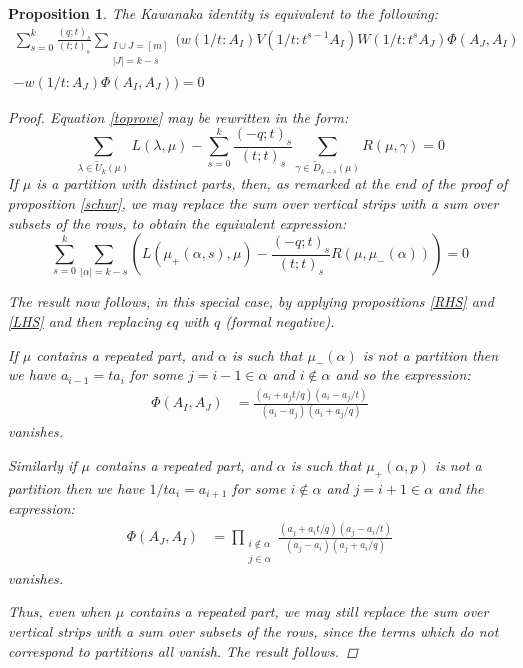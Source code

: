 \documentclass[12pt,dvips]{amsart}
\newtheorem{proposition}{Proposition}[section]
\begin{document}
\bigskip\bigskip
\begin{proposition}
The Kawanaka identity is equivalent to the following:
\begin{multline*}
\!\!\!\!\sum_{s = 0}^k \frac{(q;t)_s}{ (t;t)_s} \sum_{\substack{I \cup J = [m] \\ |J| = k-s}} \Big(w(1/t : A_I) V(1/t : t^{s-1} A_I) W(1/t : t^{s} A_J) \Phi(A_J,A_I) 
\\- w(1/t :  A_J) \Phi(A_I,A_J) \Big) = 0
\end{multline*}



\begin{proof}
Equation \eqref{toprove} may be rewritten in the form:
$$ \sum_{\lambda \in \tilde{U}_k(\mu)} L(\lambda, \mu) - \sum_{s = 0}^k \frac{(-q;t)_s}{(t;t)_s} \sum_{\gamma \in \tilde{D}_{k-s}(\mu)} R(\mu, \gamma) = 0 $$
If $\mu$ is a partition with distinct parts, then, as remarked at the end of the proof of proposition \ref{schur}, we may replace the sum over vertical strips with a sum over subsets of the rows, to obtain the equivalent expression:
$$ \sum_{s = 0}^k \sum_{|\alpha| = k-s} \left( L(\mu_+(\alpha,s), \mu) -  \frac{(-q;t)_s}{(t;t)_s} R(\mu, \mu_-(\alpha)) \right) = 0 $$

\medskip
The result now follows, in this special case, by applying propositions \ref{RHS} and \ref{LHS} and then replacing $\epsilon q$ with $q$ (formal negative).

\medskip
\noindent
If $\mu$ contains a repeated part, and $\alpha$ is such that $\mu_-(\alpha)$ is not a partition then we have $a_{i-1} = ta_i$ for some $j=i-1 \in \alpha$ and $i \not \in \alpha$ and so the expression:
\begin{align*}
\Phi(A_I,A_J)
&= \frac{(a_i + a_j t/q)(a_i - a_j/t)}{(a_i - a_j)(a_i + a_j/q)}
\end{align*}
vanishes.


\medskip
\noindent
Similarly if $\mu$ contains a repeated part, and $\alpha$ is such that $\mu_+(\alpha,p)$ is not a partition then we have $1/ta_i = a_{i+1}$ for some $i \not \in \alpha$ and $j = i+1 \in \alpha$ and the expression: 
\begin{align*}
\Phi(A_J,A_I) 
&= \prod_{\substack{i \not \in \alpha \\ j \in \alpha}}\frac{(a_j + a_i t/q)(a_j - a_i/t)}{(a_j - a_i)(a_j + a_i/q)}
\end{align*}
vanishes.

\medskip
\noindent
Thus, even when $\mu$ contains a repeated part, we may still replace the sum over vertical strips with a sum over subsets of the rows, since the terms which do not correspond to partitions all vanish. The result follows.

\end{proof}
\end{proposition}
\end{document}
